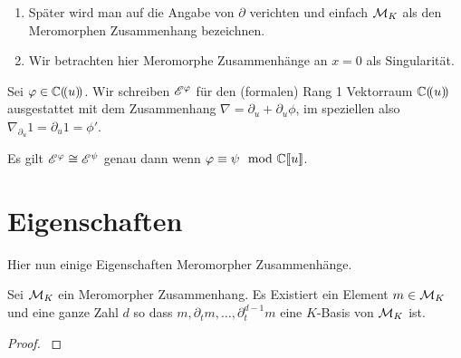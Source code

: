 \begin{bem}
  \begin{enumerate}
    \item Später wird man auf die Angabe von $\partial$ verichten und einfach
      $\mathcal{M}_K$ als den Meromorphen Zusammenhang bezeichnen.
    \item Wir betrachten hier Meromorphe Zusammenhänge an $x=0$ als
      Singularität.
  \end{enumerate}
\end{bem}

\begin{defn}
  \cite[1.a]{sabbah_Fourier-local}
  Sei $\varphi\in\mathbb{C}(\!(u)\!)$.
  Wir schreiben $\mathscr{E}^\varphi$ für den (formalen) Rang 1 Vektorraum $\mathbb{C}(\!(u)\!)$
  ausgestattet mit dem Zusammenhang $\nabla=\partial_u+\partial_u\phi$, im
  speziellen also $\nabla_{\partial_u}1=\partial_u1=\phi'$.\\

\end{defn}

\begin{bem}
  \cite[1.a]{sabbah_Fourier-local}
  Es gilt $\mathscr{E}^\varphi\cong\mathscr{E}^\psi$ genau dann wenn $\varphi\equiv\psi \mod {{\mathbb C\llbracket u\rrbracket}}$.
\end{bem}

\section{Eigenschaften}
Hier nun einige Eigenschaften Meromorpher Zusammenhänge.

\begin{lem}
  \cite[Thm 4.3.3]{sabbah_cimpa90}
  \cite[Satz 4.8]{ZulaBarbara}
  Sei $\mathcal{M}_K$ ein Meromorpher Zusammenhang. Es Existiert ein Element
  $m\in\mathcal{M}_K$ und eine ganze Zahl $d$ so dass
  $m,\partial_tm,\dots,\partial_t^{d-1}m$ eine $K$-Basis von $\mathcal{M}_K$ ist.
\end{lem}
\begin{proof}
  \cite[Satz 4.8]{ZulaBarbara}
\end{proof}

